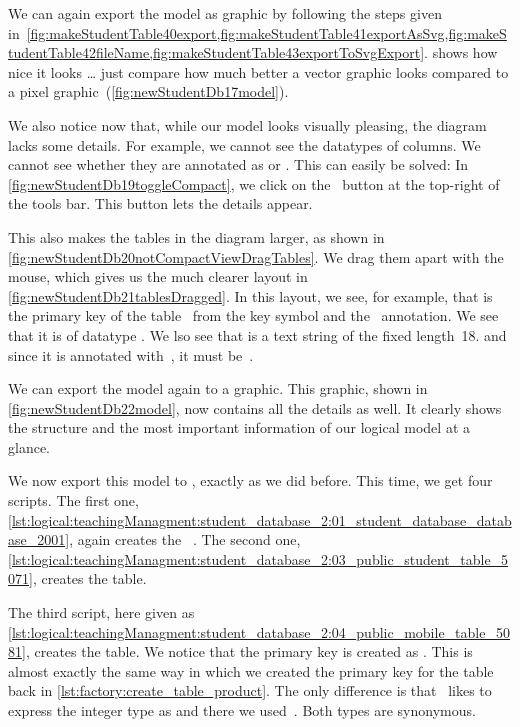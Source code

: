 We can again export the model as  graphic by following the steps given in~\cref{fig:makeStudentTable40export,fig:makeStudentTable41exportAsSvg,fig:makeStudentTable42fileName,fig:makeStudentTable43exportToSvgExport}.
 shows how nice it looks {\dots} just compare how much better a vector graphic looks compared to a pixel graphic~(\cref{fig:newStudentDb17model}).

We also notice now that, while our model looks visually pleasing, the diagram lacks some details.
For example, we cannot see the datatypes of columns.
We cannot see whether they are annotated as  or .
This can easily be solved:
In \cref{fig:newStudentDb19toggleCompact}, we click on the  \pgmodelerToggleCompact\ button at the top-right of the tools bar.
This button lets the details appear.

This also makes the tables in the diagram larger, as shown in \cref{fig:newStudentDb20notCompactViewDragTables}.
We drag them apart with the mouse, which gives us the much clearer layout in \cref{fig:newStudentDb21tablesDragged}.
In this layout, we see, for example, that  is the primary key of the table~ from the key symbol and the ~annotation.
We see that it is of datatype .
We lso see that  is a text string of the fixed length~18.
and since it is annotated with~, it must be~.

We can export the model again to a  graphic.
This graphic, shown in \cref{fig:newStudentDb22model}, now contains all the details as well.
It clearly shows the structure and the most important information of our logical model at a glance.

We now export this model to \sql, exactly as we did before.
This time, we get four scripts.
The first one, \cref{lst:logical:teachingManagment:student_database_2:01_student_database_database_2001}, again creates the ~\db.
The second one, \cref{lst:logical:teachingManagment:student_database_2:03_public_student_table_5071}, creates the  table.

The third script, here given as \cref{lst:logical:teachingManagment:student_database_2:04_public_mobile_table_5081}, creates the  table.
We notice that the primary key is created as .
This is almost exactly the same way in which we created the primary key for the  table back in \cref{lst:factory:create_table_product}.
The only difference is that \pgmodeler\ likes to express the integer type as  and there we used~.
Both types are synonymous.

